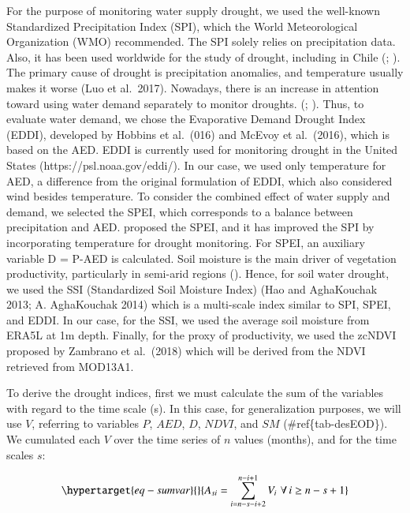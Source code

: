 \documentclass[
  authoryear,
  preprint,
  3p,
  onecolumn]{elsarticle}
\begin{document}
For the purpose of monitoring water supply drought, we used the
well-known Standardized Precipitation Index (SPI), which the World
Meteorological Organization (WMO) recommended. The SPI solely relies on
precipitation data. Also, it has been used worldwide for the study of
drought, including in Chile (\citet{Garreaud2017};
\citet{Zambrano2017}). The primary cause of drought is precipitation
anomalies, and temperature usually makes it worse (Luo et al.~2017).
Nowadays, there is an increase in attention toward using water demand
separately to monitor droughts. (\citet{Vicente-Serrano2020};
\citet{Noguera2022}). Thus, to evaluate water demand, we chose the
Evaporative Demand Drought Index (EDDI), developed by Hobbins et
al.~(016) and McEvoy et al.~(2016), which is based on the AED. EDDI is
currently used for monitoring drought in the United States
(https://psl.noaa.gov/eddi/). In our case, we used only temperature for
AED, a difference from the original formulation of EDDI, which also
considered wind besides temperature. To consider the combined effect of
water supply and demand, we selected the SPEI, which corresponds to a
balance between precipitation and AED. \citet{Vicente-Serrano2010}
proposed the SPEI, and it has improved the SPI by incorporating
temperature for drought monitoring. For SPEI, an auxiliary variable D =
P-AED is calculated. Soil moisture is the main driver of vegetation
productivity, particularly in semi-arid regions (\citet{Li2022}). Hence,
for soil water drought, we used the SSI (Standardized Soil Moisture
Index) (Hao and AghaKouchak 2013; A. AghaKouchak 2014) which is a
multi-scale index similar to SPI, SPEI, and EDDI. In our case, for the
SSI, we used the average soil moisture from ERA5L at 1m depth. Finally,
for the proxy of productivity, we used the zcNDVI proposed by Zambrano
et al.~(2018) which will be derived from the NDVI retrieved from
MOD13A1.

To derive the drought indices, first we must calculate the sum of the
variables with regard to the time scale (s). In this case, for
generalization purposes, we will use \(V\), referring to variables
\(P\), \(AED\), \(D\), \(NDVI\), and \(SM\) (\#ref\{tab-desEOD\}). We
cumulated each \(V\) over the time series of \(n\) values (months), and
for the time scales \(s\):

\begin{equation}\protect\hypertarget{eq-sumvar}{}{A_{si} = \sum_{i=n-s-i+2}^{n-i+1} V_i\,\, \forall\, i\geq n-s+1  }\label{eq-sumvar}\end{equation}
\end{document}
